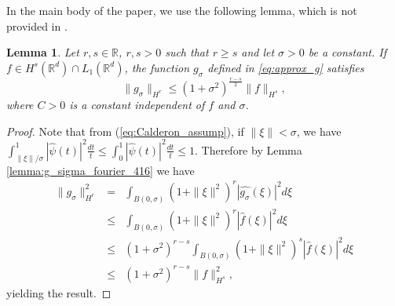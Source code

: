 \documentclass[11pt]{article}
\newtheorem{lemma}[theorem]{Lemma}
\theoremstyle{remark}
\theoremstyle{example}
\theoremstyle{remark}
\newcommand{\R}{\mathbb{R}}
\begin{document}
In the main body of the paper, we use the following lemma, which is not provided in \cite{NarWar04}.


\begin{lemma} \label{eq:gsigma_norm}
Let $r,s\in\mathbb{R}$, $r, s > 0$ such that  $r \geq s$ and let $\sigma > 0$ be a constant. 
If $f \in H^s(\R^d) \cap L_1(\R^d)$, the function $g_\sigma$ defined in \eqref{eq:approx_g} satisfies
\begin{equation}
\| g_\sigma \|_{H^r} \leq (1 + \sigma^2)^{\frac{r-s}{2}} \| f \|_{H^s},\nonumber
\end{equation}
where $C > 0$ is a constant independent of $f$ and $\sigma$.%
\end{lemma}
\begin{proof}
\begin{comment}
By Lemma \ref{lemma:g_sigma_fourier_416}, the Fourier transform of $g_\sigma$ can be written as
\begin{equation}
\hat{g}_\sigma(\xi)  = \hat{f}(\xi)
\begin{cases}
\int_{\|\xi \| /\sigma}^1 | \hat{\psi}(t) |^2 \frac{dt}{t}, \quad {\rm if}\ \| \xi \| < \sigma\\
0, \quad {\rm otherwise}\
\end{cases}.\nonumber
\end{equation}
\end{comment}

Note that from (\ref{eq:Calderon_assump}), if $\| \xi \| < \sigma$, we have 
$
\int_{\| \xi \| /\sigma}^1 | \hat{\psi}(t) |^2 \frac{dt}{t} \leq \int_{0}^1 | \hat{\psi}(t) |^2 \frac{dt}{t} \leq 1.
$
Therefore by Lemma \ref{lemma:g_sigma_fourier_416} we have %
\begin{eqnarray*}
\| g_\sigma \|_{H^r}^2 
&=&   \int_{B(0,\sigma)} (1 + \|\xi \|^2)^r | \hat{g_\sigma}(\xi) |^2 d\xi \\
&\leq&   \int_{B(0,\sigma)} (1 + \|\xi \|^2)^r | \hat{f}(\xi) |^2 d\xi \\
&\leq&   (1 + \sigma^2)^{r-s} \int_{B(0,\sigma)}  (1 + \|\xi \|^2)^s | \hat{f}(\xi) |^2 d\xi \\
&\leq&   (1 + \sigma^2)^{r-s}  \| f \|_{H^s}^2,
\end{eqnarray*}
yielding the result.
\end{proof}
\end{document}

